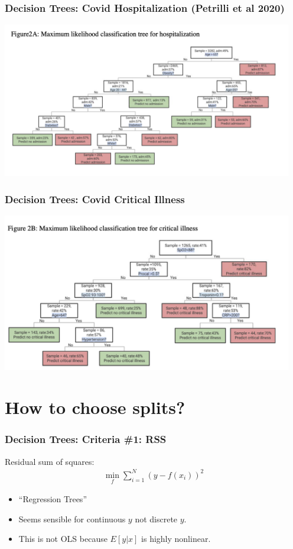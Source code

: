 \documentclass[xcolor=pdftex,dvipsnames,table,mathserif,aspectratio=169]{beamer}
\begin{document}


\begin{frame}
\frametitle{Decision Trees: Covid Hospitalization (Petrilli et al 2020)}
\includegraphics[width=5in]{./resources/covid_tree1.png}
\end{frame}


\begin{frame}
\frametitle{Decision Trees: Covid Critical Illness}
\includegraphics[width=5in]{./resources/covid_tree2.png}
\end{frame}

\section{How to choose splits?}

\begin{frame}
\frametitle{Decision Trees: Criteria \#1: RSS}
Residual sum of squares:
\begin{align*}
\min_f \sum_{i=1}^N (y - f(x_i))^2
\end{align*}
\begin{itemize}
\item ``Regression Trees''
\item Seems sensible for continuous $y$ not discrete $y$.
\item This is not OLS because $E[y | x]$ is \alert{highly nonlinear}.
\end{itemize}
\end{frame}
\end{document}
